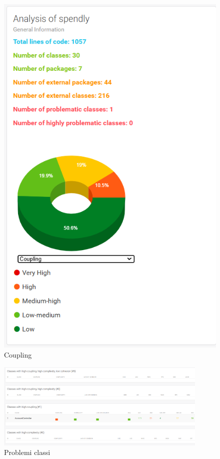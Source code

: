 \begin{figure}[H]
\begin{minipage}{0.45\textwidth}
    \end{minipage}
    \hfill
    \begin{minipage}{0.45\textwidth}
        \centering
        \includegraphics[width=\textwidth]{images/Coupling_iter2.png}
        \caption{Coupling}
        \label{fig:Coupling_iterazione2}
    \end{minipage}
\end{figure}

\begin{figure}[H]
    \centering
    \includegraphics[width=0.9\textwidth]{images/Problem_iter2.png}
    \caption{Problemi classi}
    \label{fig:Problemi_iterazione2}
\end{figure}


